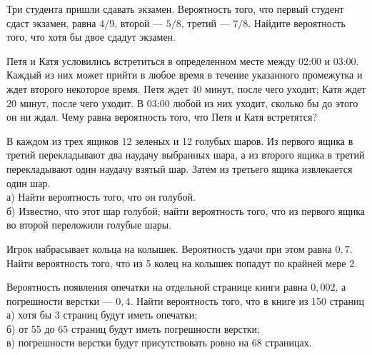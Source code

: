 \newpage\setcounter{zad}{0}



\begin{zkrW}{20}\noindent 
	Три студента пришли сдавать экзамен. Вероятность того, что первый студент сдаст экзамен, равна $4/9$, второй --- $5/8$, третий --- $7/8$. Найдите вероятность того, что хотя бы двое сдадут экзамен.
 
\end{zkrW}

\begin{zkrW}{20}\noindent 
	Петя и Катя условились встретиться в определенном месте между 02:00 и 03:00. Каждый из них может прийти в любое время в течение указанного промежутка и ждет второго некоторое время. Петя ждет 40 минут, после чего уходит; Катя ждет 20 минут, после чего уходит. В 03:00 любой из них уходит, сколько бы до этого он ни ждал. Чему равна вероятность того, что Петя и Катя встретятся?
 
\end{zkrW}

\begin{zkrW}{20}\noindent 
	В каждом из трех ящиков 12 зеленых и 12 голубых шаров. Из первого ящика в третий перекладывают два наудачу выбранных шара, а из второго ящика в третий перекладывают один наудачу взятый шар. Затем из третьего ящика извлекается один шар. \\ \indent а) Найти вероятность того, что он голубой. \\ \indent б) Известно, что этот шар голубой; найти вероятность того, что из первого ящика во второй переложили голубые шары.
 
\end{zkrW}

\begin{zkrW}{20}\noindent 
	Игрок набрасывает кольца на колышек. Вероятность удачи при этом равна $0{,}7$. Найти вероятность того, что из 5 колец на колышек попадут по крайней мере 2.
 
\end{zkrW}

\begin{zkrW}{20}\noindent 
	Вероятность появления опечатки на отдельной странице книги равна $0{,}002$, а погрешности верстки --- $0{,}4$. Найти вероятность того, что в книге из 150 страниц \\ \indent а) хотя бы 3 страниц будут иметь опечатки; \\ \indent б) от 55 до 65 страниц будут иметь погрешности верстки; \\ \indent в) погрешности верстки будут присутствовать ровно на 68 страницах.
 
\end{zkrW}

